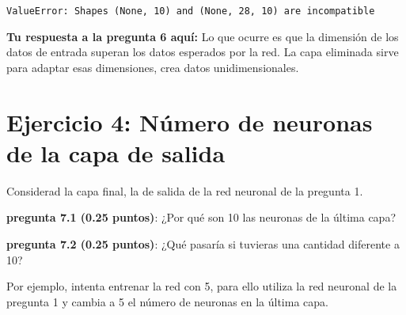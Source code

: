 \documentclass[12pt,a4paper,table]{article}
\begin{document}
\begin{Verbatim}[commandchars=\\\{\}, frame=single, framerule=2mm, rulecolor=\color{outerrorbackground}]
    ValueError: Shapes (None, 10) and (None, 28, 10) are incompatible

    \end{Verbatim}

    \textbf{Tu respuesta a la pregunta 6 aquí:} Lo que ocurre es que la dimensión de
los datos de entrada superan los datos esperados por la red. La capa
eliminada sirve para adaptar esas dimensiones, crea datos
unidimensionales.

    \hypertarget{ejercicio-4-nuxfamero-de-neuronas-de-la-capa-de-salida}{%
\section{\texorpdfstring{\textbf{Ejercicio 4: Número de neuronas de la
capa de
salida}}{Ejercicio 4: Número de neuronas de la capa de salida}}\label{ejercicio-4-nuxfamero-de-neuronas-de-la-capa-de-salida}}

Considerad la capa final, la de salida de la red neuronal de la pregunta
1.

\textbf{pregunta 7.1 (0.25 puntos)}: ¿Por qué son 10 las neuronas de la
última capa?

\textbf{pregunta 7.2 (0.25 puntos)}: ¿Qué pasaría si tuvieras una
cantidad diferente a 10?

Por ejemplo, intenta entrenar la red con 5, para ello utiliza la red
neuronal de la pregunta 1 y cambia a 5 el número de neuronas en la
última capa.
\end{document}

